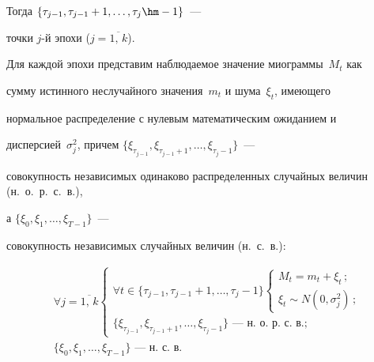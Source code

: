 Тогда $\{\tau_{j-1}, \tau_{j-1} + 1 , \ldots , \tau_{j} \hm- 1\}$~---


точки $j$-й эпохи ($j=\overline{1,\,k}$).





Для каждой эпохи представим наблюдаемое значение миограммы~$M_t$ как


сумму истинного неслучайного значения~$m_t$ и шума~$\xi_t$, имеющего


нормальное распределение с нулевым математическим ожиданием и


дисперсией~$\sigma^2_j$, причем $\{\xi_{\tau_{j-1}},


\xi_{\tau_{j-1}+1} , \ldots ,  \xi_{\tau_{j}-1}\}$~---


совокупность независимых одинаково распределенных случайных величин (н.~о.~р.~с.~в.),


а $\{\xi_0,  \xi_1 , \ldots ,  \xi_{T-1}\}$~---


совокупность независимых случайных величин (н.~с.~в.):


\begin{equation}


    \label{miogramma}


    \begin{split}


&\forall j=\overline{1, \, k}


    \begin{cases}


 \forall t \in \{\tau_{j-1}, \tau_{j-1} + 1 ,\ldots, \tau_{j} - 1\}


        \begin{cases}


            M_t = m_t + \xi_t \,;  \\


            \xi_t \sim N\left(0,\sigma^2_j\right)\,;


        \end{cases}\\


        \{\xi_{\tau_{j-1}} ,  \xi_{\tau_{j-1}+1} , \ldots,


        \xi_{\tau_{j}-1}\} \mbox{ --- н.~о.~р.~с.~в.;}


    \end{cases}\\


&\{\xi_0 ,  \xi_1 , \ldots,  \xi_{T-1}\} \mbox{ --- н.~с.~в.}


\end{split}


    \end{equation}


